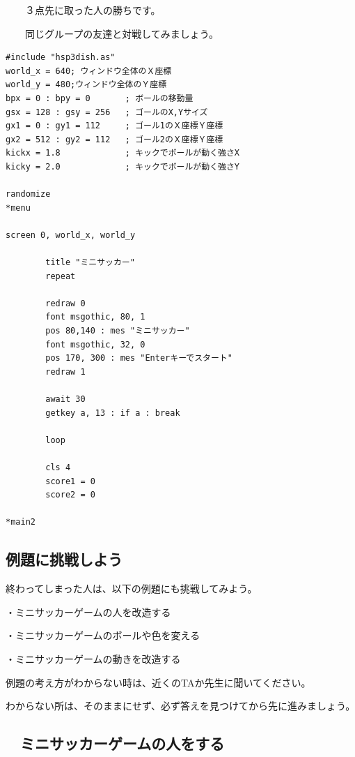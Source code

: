 \ \ \ \ ３点先に取った人の勝ちです。

\ \ \ \ 同じグループの友達と対戦してみましょう。



\begin{lstlisting}[caption=ミニサッカーゲームのプログラムの一部]
#include "hsp3dish.as"
world_x = 640; ウィンドウ全体のＸ座標
world_y = 480;ウィンドウ全体のＹ座標
bpx = 0 : bpy = 0       ; ボールの移動量
gsx = 128 : gsy = 256   ; ゴールのX,Yサイズ
gx1 = 0 : gy1 = 112     ; ゴール1のＸ座標Ｙ座標
gx2 = 512 : gy2 = 112   ; ゴール2のＸ座標Ｙ座標
kickx = 1.8             ; キックでボールが動く強さX
kicky = 2.0             ; キックでボールが動く強さY

randomize
*menu

screen 0, world_x, world_y

        title "ミニサッカー"
        repeat

        redraw 0
        font msgothic, 80, 1
        pos 80,140 : mes "ミニサッカー"
        font msgothic, 32, 0
        pos 170, 300 : mes "Enterキーでスタート"
        redraw 1

        await 30
        getkey a, 13 : if a : break

        loop

        cls 4
        score1 = 0
        score2 = 0

*main2
\end{lstlisting}


\newpage
\subsection{例題に挑戦しよう}

終わってしまった人は、以下の例題にも挑戦してみよう。


・ミニサッカーゲームの人を改造する

・ミニサッカーゲームのボールや色を変える

・ミニサッカーゲームの動きを改造する



例題の考え方がわからない時は、近くのTAか先生に聞いてください。

わからない所は、そのままにせず、必ず答えを見つけてから先に進みましょう。
\newpage
\subsection{\useOmetoiExample　ミニサッカーゲームの人をする}

